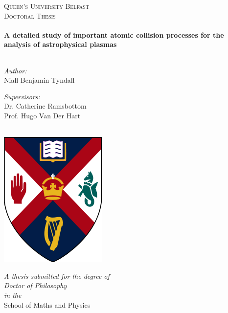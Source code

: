 \documentclass[12pt, a4paper, oneside]{Thesis} %
\begin{document}
\begin{titlepage}
\begin{center}

\textsc{\LARGE Queen's University Belfast}\\[1.5cm] %
\textsc{\Large Doctoral Thesis}\\[0.5cm] %

\HRule \\[0.4cm] %
{\huge \bfseries A detailed study of important atomic collision processes for the analysis of astrophysical plasmas}\\[0.2cm] %
\HRule \\[1.5cm] %
 
\begin{minipage}{0.4\textwidth}
\begin{flushleft} \large
\emph{Author:}\\
{Niall Benjamin Tyndall} %
\end{flushleft}
\end{minipage}
\begin{minipage}{0.4\textwidth}
\begin{flushright} \large
\emph{Supervisors:} \\
{Dr. Catherine Ramsbottom\\
Prof. Hugo Van Der Hart}\\ %
\end{flushright}
\end{minipage}\\[1cm]
 
 \vfill
  \vfill
 \includegraphics[scale=0.6]{qub.png}
 
  \vfill
   \vfill
\large \textit{A thesis submitted for the degree of\\ {\sc Doctor of Philosophy}}\\[0.4cm] %
\textit{in the}\\ {\sc School of Maths and Physics}\\[0.4cm]
 

\end{center}
\end{titlepage}
\end{document}
